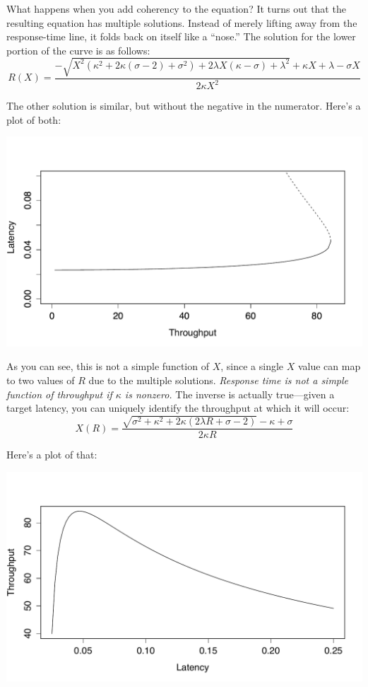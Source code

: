 \documentclass{vivid_layout}
\begin{document}
What happens when you add coherency to the equation? It turns out that the
resulting equation has multiple solutions.  Instead of merely lifting away from
the response-time line, it folds back on itself like a ``nose.'' The solution
for the lower portion of the curve is as follows:
\begin{equation}
R(X)=\frac{-\sqrt{X^2(\kappa^2+2\kappa(\sigma-2) + \sigma^2)+2\lambda X(\kappa-\sigma)+\lambda^2}+\kappa X+\lambda-\sigma X}{2\kappa X^2}
\label{r_x_lower}
\end{equation}

The other solution is similar, but without the negative in the numerator. Here's a plot of both:
\begin{center}
\includegraphics[width=.85\linewidth]{scalability/nose-equation}
\end{center}

As you can see, this is not a simple function of $X$, since a single $X$ value
can map to two values of $R$ due to the multiple solutions. {\itshape Response
time is not a simple function of throughput if $\kappa$ is nonzero.} The inverse is
actually true---given a target latency, you can uniquely identify the throughput
at which it will occur:
\begin{equation}
X(R)=\frac{\sqrt{\sigma^2+\kappa^2+2\kappa(2\lambda R+\sigma-2)}-\kappa+\sigma}{2\kappa R}
\label{x_r}
\end{equation}

Here's a plot of that:
\begin{center}
\includegraphics[width=.85\linewidth]{scalability/x-function-r}
\end{center}
\end{document}
